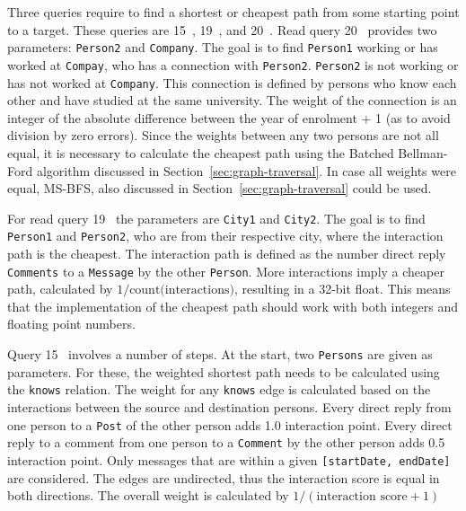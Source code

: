 Three queries require to find a shortest or cheapest path from some starting point to a target. These queries are 15~\cite{snb-bi-15}, 19~\cite{snb-bi-19}, and 20~\cite{snb-bi-20}. 
Read query 20~\cite{snb-bi-20} provides two parameters: \texttt{Person2} and \texttt{Company}. 
The goal is to find \texttt{Person1} working or has worked at \texttt{Compay}, who has a connection with \texttt{Person2}. 
\texttt{Person2} is not working or has not worked at \texttt{Company}. 
This connection is defined by persons who know each other and have studied at the same university. 
The weight of the connection is an integer of the absolute difference between the year of enrolment + 1 (as to avoid division by zero errors).
Since the weights between any two persons are not all equal, it is necessary to calculate the cheapest path using the Batched Bellman-Ford algorithm discussed in Section~\ref{sec:graph-traversal}. In case all weights were equal, MS-BFS, also discussed in Section~\ref{sec:graph-traversal} could be used. 

For read query 19~\cite{snb-bi-19} the parameters are \texttt{City1} and \texttt{City2}. The goal is to find \texttt{Person1} and \texttt{Person2}, who are from their respective city, where the interaction path is the cheapest. The interaction path is defined as the number direct reply \texttt{Comments} to a \texttt{Message} by the other \texttt{Person}. More interactions imply a cheaper path, calculated by $1 / \textrm{count(interactions)}$, resulting in a 32-bit float. This means that the implementation of the cheapest path should work with both integers and floating point numbers. 

Query 15~\cite{snb-bi-15} involves a number of steps. At the start, two \texttt{Persons} are given as parameters. For these, the weighted shortest path needs to be calculated using the \texttt{knows} relation. The weight for any \texttt{knows} edge is calculated based on the interactions between the source and destination persons. Every direct reply from one person to a \texttt{Post} of the other person adds 1.0 interaction point. Every direct reply to a comment from one person to a \texttt{Comment} by the other person adds 0.5 interaction point. Only messages that are within a given \texttt{[startDate, endDate]} are considered. The edges are undirected, thus the interaction score is equal in both directions. The overall weight is calculated by $1 / (\textrm{interaction score} + 1)$

